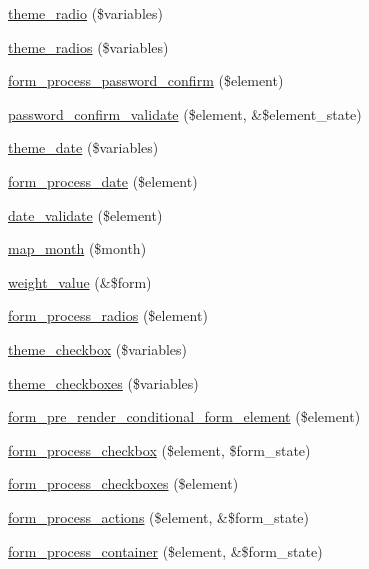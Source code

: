 \begin{DoxyCompactItemize}
\hyperlink{group__themeable_ga1cb9f23d9d87c9189591becc9a456907}{theme\_\-radio} (\$variables)
\item 
\hyperlink{group__themeable_gafcfb357ed36fd4f881d6f8f29d67a762}{theme\_\-radios} (\$variables)
\item 
\hyperlink{group__form__api_gae3a3dcd1a5e4e44c5c03bb1426066596}{form\_\-process\_\-password\_\-confirm} (\$element)
\item 
\hyperlink{group__form__api_gafa275652bc0a5641a124bc60727caa8a}{password\_\-confirm\_\-validate} (\$element, \&\$element\_\-state)
\item 
\hyperlink{group__themeable_ga78957bb9be7b270a6d3ec9ea26b4bf3e}{theme\_\-date} (\$variables)
\item 
\hyperlink{group__form__api_gabc6b74cff84954f970d4997390473160}{form\_\-process\_\-date} (\$element)
\item 
\hyperlink{group__form__api_ga2a44cde876324e1333edb5fda5799c83}{date\_\-validate} (\$element)
\item 
\hyperlink{group__form__api_ga11e3cb67c8622b662acc4dff61e146a7}{map\_\-month} (\$month)
\item 
\hyperlink{group__form__api_gad80eba4897b841808cb71e6ba97603b2}{weight\_\-value} (\&\$form)
\item 
\hyperlink{group__form__api_ga61392e82fbc6eeeaf967b864da098ebc}{form\_\-process\_\-radios} (\$element)
\item 
\hyperlink{group__themeable_ga564057bbdee3072a89cee1d6e1d54168}{theme\_\-checkbox} (\$variables)
\item 
\hyperlink{group__themeable_gad099d8895d2a4e86fa807a369d533648}{theme\_\-checkboxes} (\$variables)
\item 
\hyperlink{group__form__api_gac0bc3f3520adb84698903c4d0078fe2c}{form\_\-pre\_\-render\_\-conditional\_\-form\_\-element} (\$element)
\item 
\hyperlink{group__form__api_gab1a1b30f07888d0fa0de8b8222ee7994}{form\_\-process\_\-checkbox} (\$element, \$form\_\-state)
\item 
\hyperlink{group__form__api_ga916a0224fe0771749af2c05dfdb13df1}{form\_\-process\_\-checkboxes} (\$element)
\item 
\hyperlink{group__form__api_ga32dae38034437282e774ecf9436fcdaa}{form\_\-process\_\-actions} (\$element, \&\$form\_\-state)
\item 
\hyperlink{group__form__api_ga8a121eab47e8d864fcc62f8d8443f501}{form\_\-process\_\-container} (\$element, \&\$form\_\-state)
\item 

\end{DoxyCompactItemize}
